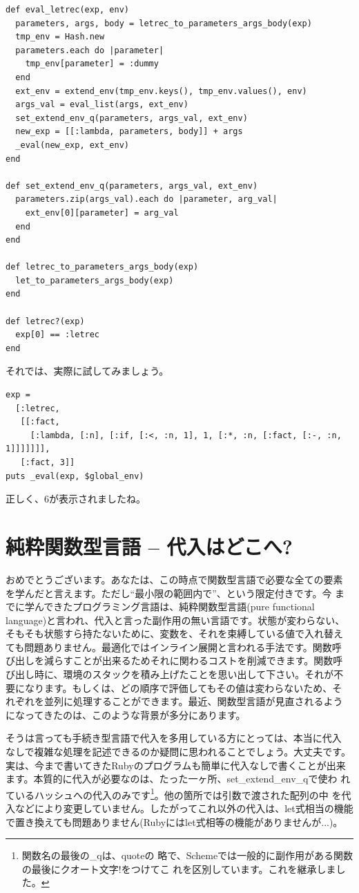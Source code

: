 \begin{lstlisting}
def eval_letrec(exp, env)
  parameters, args, body = letrec_to_parameters_args_body(exp)
  tmp_env = Hash.new
  parameters.each do |parameter| 
    tmp_env[parameter] = :dummy
  end
  ext_env = extend_env(tmp_env.keys(), tmp_env.values(), env)
  args_val = eval_list(args, ext_env)
  set_extend_env_q(parameters, args_val, ext_env)
  new_exp = [[:lambda, parameters, body]] + args
  _eval(new_exp, ext_env)
end

def set_extend_env_q(parameters, args_val, ext_env)
  parameters.zip(args_val).each do |parameter, arg_val|
    ext_env[0][parameter] = arg_val
  end
end

def letrec_to_parameters_args_body(exp)
  let_to_parameters_args_body(exp)
end

def letrec?(exp)
  exp[0] == :letrec
end
\end{lstlisting}

それでは、実際に試してみましょう。

\begin{lstlisting}
exp =
  [:letrec, 
   [[:fact,
     [:lambda, [:n], [:if, [:<, :n, 1], 1, [:*, :n, [:fact, [:-, :n, 1]]]]]]], 
   [:fact, 3]]
puts _eval(exp, $global_env)
\end{lstlisting}

正しく、6が表示されましたね。

\section{純粋関数型言語 -- 代入はどこへ?}

おめでとうございます。あなたは、この時点で関数型言語で必要な全ての要素
を学んだと言えます。ただし“最小限の範囲内で”、という限定付きです。今
までに学んできたプログラミング言語は、純粋関数型言語(pure functional
language)と言われ、代入と言った副作用の無い言語です。状態が変わらない、
そもそも状態すら持たないために、変数を、それを束縛している値で入れ替え
ても問題ありません。最適化ではインライン展開と言われる手法です。関数呼
び出しを減らすことが出来るためそれに関わるコストを削減できます。関数呼
び出し時に、環境のスタックを積み上げたことを思い出して下さい。それが不
要になります。もしくは、どの順序で評価してもその値は変わらないため、そ
れぞれを並列に処理することができます。最近、関数型言語が見直されるよう
になってきたのは、このような背景が多分にあります。

そうは言っても手続き型言語で代入を多用している方にとっては、本当に代入
なしで複雑な処理を記述できるのか疑問に思われることでしょう。大丈夫です。
実は、今まで書いてきたRubyのプログラムも簡単に代入なしで書くことが出来
ます。本質的に代入が必要なのは、たった一ヶ所、set\_extend\_env\_qで使わ
れているハッシュへの代入のみです\footnote{関数名の最後の\_qは、quoteの
略で、Schemeでは一般的に副作用がある関数の最後にクオート文字!をつけてこ
れを区別しています。これを継承しました。}。他の箇所では引数で渡された配列の中
を代入などにより変更していません。したがってこれ以外の代入は、let式相当の機能
で置き換えても問題ありません(Rubyにはlet式相等の機能がありませんが...)。


